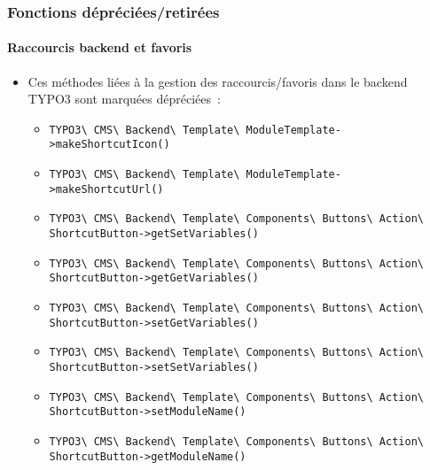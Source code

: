 %

\begin{frame}[fragile]
	\frametitle{Fonctions dépréciées/retirées}
	\framesubtitle{Raccourcis backend et favoris}

	\begin{itemize}
		\item Ces méthodes liées à la gestion des raccourcis/favoris dans
			le backend TYPO3 sont marquées dépréciées~:
			\vspace{0.2cm}
			\begin{itemize}\tiny
				\item \texttt{TYPO3\textbackslash
					CMS\textbackslash
					Backend\textbackslash
					Template\textbackslash
					ModuleTemplate->makeShortcutIcon()}
				\item \texttt{TYPO3\textbackslash
					CMS\textbackslash
					Backend\textbackslash
					Template\textbackslash
					ModuleTemplate->makeShortcutUrl()}
				\item \texttt{TYPO3\textbackslash
					CMS\textbackslash
					Backend\textbackslash
					Template\textbackslash
					Components\textbackslash
					Buttons\textbackslash
					Action\textbackslash
					ShortcutButton->getSetVariables()}
				\item \texttt{TYPO3\textbackslash
					CMS\textbackslash
					Backend\textbackslash
					Template\textbackslash
					Components\textbackslash
					Buttons\textbackslash
					Action\textbackslash
					ShortcutButton->getGetVariables()}
				\item \texttt{TYPO3\textbackslash
					CMS\textbackslash
					Backend\textbackslash
					Template\textbackslash
					Components\textbackslash
					Buttons\textbackslash
					Action\textbackslash
					ShortcutButton->setGetVariables()}
				\item \texttt{TYPO3\textbackslash
					CMS\textbackslash
					Backend\textbackslash
					Template\textbackslash
					Components\textbackslash
					Buttons\textbackslash
					Action\textbackslash
					ShortcutButton->setSetVariables()}
				\item \texttt{TYPO3\textbackslash
					CMS\textbackslash
					Backend\textbackslash
					Template\textbackslash
					Components\textbackslash
					Buttons\textbackslash
					Action\textbackslash
					ShortcutButton->setModuleName()}
				\item \texttt{TYPO3\textbackslash
					CMS\textbackslash
					Backend\textbackslash
					Template\textbackslash
					Components\textbackslash
					Buttons\textbackslash
					Action\textbackslash
					ShortcutButton->getModuleName()}
			\end{itemize}\normalsize


\end{itemize}
\end{frame}
